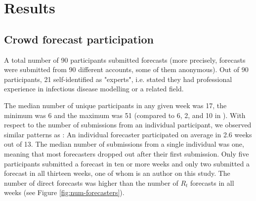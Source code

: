 \documentclass[10pt,a4paper,twocolumn]{article}
\begin{document}
\section*{Results}

\subsection*{Crowd forecast participation}

A total number of 90 participants submitted forecasts (more precisely, forecasts were submitted from 90 different accounts, some of them anonymous). Out of 90 participants, 21 self-identified as "experts", i.e. stated they had professional experience in infectious disease modelling or a related field. 

The median number of unique participants in any given week was 17, the minimum was 6 and the maximum was 51 (compared to 6, 2, and 10 in \cite{bosseComparingHumanModelbased2022}). With respect to the number of submissions from an individual participant, we observed similar patterns as \cite{bosseComparingHumanModelbased2022}: An individual forecaster participated on average in 2.6 weeks out of 13. The median number of submissions from a single individual was one, meaning that most forecasters dropped out after their first submission. Only five participants submitted a forecast in ten or more weeks and only two submitted a forecast in all thirteen weeks, one of whom is an author on this study. The number of direct forecasts was higher than the number of $R_t$ forecasts in all weeks (see Figure \ref{fig:num-forecasters}). 
\end{document}
